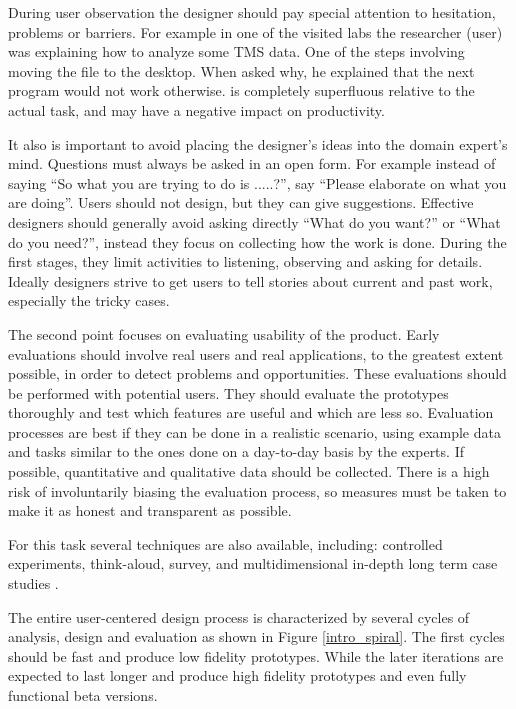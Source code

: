 During user observation the designer should pay special attention to hesitation, problems or barriers. For example in one of the visited labs the researcher (user) was explaining how to analyze some TMS data. One of the steps involving moving the file to the desktop. When asked  why, he explained that the next program would not work otherwise. is completely superfluous relative to the actual task, and may have a negative impact on productivity.

It also is important to avoid placing the designer's ideas into the domain expert's mind. Questions must always be asked in an open form. For example instead of saying ``So what you are trying to do is .....?'', say ``Please elaborate on what you are doing''. Users should not design, but they can give suggestions. Effective designers should generally avoid asking directly ``What do you want?'' or ``What do you need?'', instead they focus on collecting how the work is done. During the first stages, they limit activities to listening, observing and asking for details. Ideally designers strive to get users to tell stories about current and past work, especially the tricky cases.

\smallskip

The second point focuses on evaluating usability of the product.  Early evaluations should involve real users and real applications, to the greatest extent possible, in order to detect problems and opportunities. These evaluations should be performed with potential users. They should evaluate the prototypes thoroughly and test which features are useful and which are less so. Evaluation processes are best if they can be done in a realistic scenario, using example data and tasks similar to the ones done on a day-to-day basis by the experts. If possible, quantitative and qualitative data should be collected. There is a high risk of involuntarily biasing the evaluation process, so measures must be taken to make it as honest and transparent as possible.

For this task several techniques are also available, including: controlled experiments, think-aloud, survey, and multidimensional in-depth long term case studies \autocite{shneiderman_strategies_2006}.

\smallskip

The entire user-centered design process is characterized by several cycles of analysis, design and evaluation as shown in Figure \ref{intro_spiral}. The first cycles should be fast and produce low fidelity prototypes. While the later iterations are expected to last longer and produce high fidelity prototypes and even fully functional beta versions.


